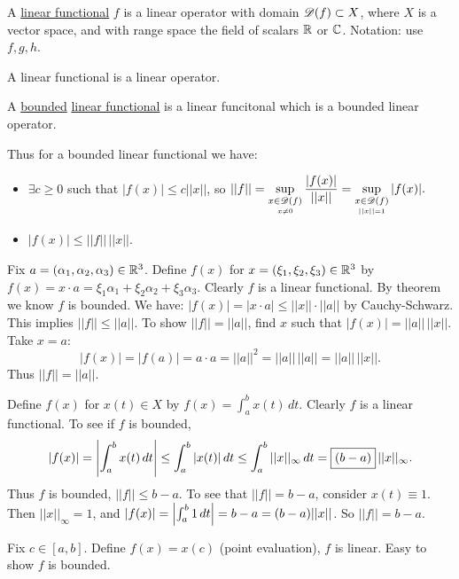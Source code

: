\documentclass[]{article}
\begin{document}
\begin{definition}
	A \ul{linear functional} $f$ is a linear operator with domain $\mathscr{D}(f)\subset X$, where $X$ is a vector space, and with range space the field of scalars $\mathbb{R}$ or $\mathbb{C}$.
	Notation: use $f,g,h$.
\end{definition}
\begin{note}
	A linear functional is a linear operator.
\end{note}
\begin{definition}
	A \ul{bounded} \ul{linear functional} is a linear funcitonal which is a bounded linear operator.
\end{definition}
	Thus for a bounded linear functional we have:
\begin{itemize}
	\item $\exists c\geq 0$ such that $|f(x)|\leq c||x||$,
		so $\displaystyle ||f|| = \sup_{\underset{x\neq0}{x\in\mathscr{D}(f)}} \frac{|f(x)|}{||x||}
		= \sup_{\underset{||x||=1}{x\in\mathscr{D}(f)}} |f(x)|. $
		\item $|f(x)| \leq ||f||\,||x||$.
\end{itemize}
\begin{example}
	[$X=\mb R^3$ with Euclidean norm] Fix $a=(\alpha_1,\alpha_2,\alpha_3)\in\mathbb{R}^3$.
	Define $f(x)$ for $x=(\xi_1,\xi_2,\xi_3)\in\mathbb{R}^3$ by $f(x) = x\cdot a = \xi_1\alpha_1+\xi_2\alpha_2+\xi_3\alpha_3$.
	Clearly $f$ is a linear functional.
	By theorem we know $f$ is bounded. We have: $|f(x)|=|x\cdot a|\leq ||x||\cdot||a||$ by Cauchy-Schwarz.
	This implies $||f||\leq||a||$. To show $||f||=||a||$, find $x$ such that $|f(x)|=||a||\,||x||$.
	Take $x=a$: $$|f(x)|=|f(a)| = a\cdot a = ||a||^2 = ||a||\,||a|| = ||a||\,||x||.$$
	Thus $||f||=||a||$.
\end{example}
\begin{example}
	[$X= C{[}a,b{]}$ with $||\cdot||_\infty$] Define $f(x)$ for $x(t)\in X$ by $f(x) = \int_a^bx(t)\,dt$.
	Clearly $f$ is a linear functional.
	To see if $f$ is bounded,
	\begin{align*}
		|f(x)| = \left|\int_a^bx(t)\,dt\right|
			   \leq \int_a^b|x(t)|\,dt
			   \leq \int_a^b||x||_\infty\,dt
			   = \fbox{$(b-a)$}\,||x||_\infty.
	\end{align*}
	Thus $f$ is bounded, $||f||\leq b-a$.
	To see that $||f||=b-a$, consider $x(t)\equiv 1$.
	Then $||x||_\infty=1$, and $|f(x)| = \left|\int_a^b1\,dt\right| = b-a = (b-a)||x||$.
	So $||f||=b-a$.
\end{example}
\begin{example}
	[$X = C{[}a,b{]}$ with $||\cdot||_\infty$] Fix $c\in[a,b]$.
	Define $f(x) = x(c)$ (point evaluation), $f$ is linear. Easy to show $f$ is bounded.
\end{example}
\end{document}
